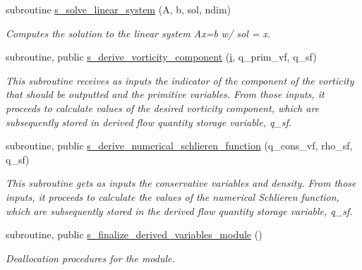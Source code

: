 \begin{Indent}
\begin{DoxyCompactItemize}
subroutine \hyperlink{namespacem__derived__variables_a2604318b4c2822441b485a32c755e5b6}{s\+\_\+solve\+\_\+linear\+\_\+system} (A, b, sol, ndim)
\begin{DoxyCompactList}\small\item\em Computes the solution to the linear system Ax=b w/ sol = x. \end{DoxyCompactList}\item 
subroutine, public \hyperlink{namespacem__derived__variables_aa038ec37a8a0c8fe8d7185b9ef6d54a9}{s\+\_\+derive\+\_\+vorticity\+\_\+component} (\hyperlink{m__data__output_8f90_aaea4baed8fd8b780f6938f0dc1fb0f72}{i}, q\+\_\+prim\+\_\+vf, q\+\_\+sf)
\begin{DoxyCompactList}\small\item\em This subroutine receives as inputs the indicator of the component of the vorticity that should be outputted and the primitive variables. From those inputs, it proceeds to calculate values of the desired vorticity component, which are subsequently stored in derived flow quantity storage variable, q\+\_\+sf. \end{DoxyCompactList}\item 
subroutine, public \hyperlink{namespacem__derived__variables_af816bc88ed55a050bfe8f2ab94d89cba}{s\+\_\+derive\+\_\+numerical\+\_\+schlieren\+\_\+function} (q\+\_\+cons\+\_\+vf, rho\+\_\+sf, q\+\_\+sf)
\begin{DoxyCompactList}\small\item\em This subroutine gets as inputs the conservative variables and density. From those inputs, it proceeds to calculate the values of the numerical Schlieren function, which are subsequently stored in the derived flow quantity storage variable, q\+\_\+sf. \end{DoxyCompactList}\item 
subroutine, public \hyperlink{namespacem__derived__variables_a735665bf598281689158d9d6e075f3d4}{s\+\_\+finalize\+\_\+derived\+\_\+variables\+\_\+module} ()
\begin{DoxyCompactList}\small\item\em Deallocation procedures for the module. \end{DoxyCompactList}\end{DoxyCompactItemize}
\end{Indent}
